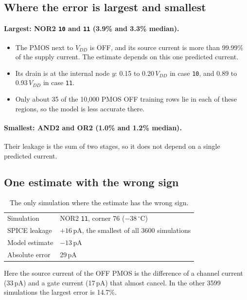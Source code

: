 \documentclass{article}
\begin{document}
\subsection{Where the error is largest and smallest}

\paragraph{Largest: NOR2 \texttt{10} and \texttt{11} (3.9\% and 3.3\% median).}
\begin{itemize}
    \item The PMOS next to $V_{DD}$ is OFF, and its source current is more
          than 99.99\% of the supply current. The estimate depends on this
          one predicted current.
    \item Its drain is at the internal node $y$: 0.15 to 0.20\,$V_{DD}$ in
          case \texttt{10}, and 0.89 to 0.93\,$V_{DD}$ in case \texttt{11}.
    \item Only about 35 of the 10{,}000 PMOS OFF training rows lie in each
          of these regions, so the model is less accurate there.
\end{itemize}

\paragraph{Smallest: AND2 and OR2 (1.0\% and 1.2\% median).}
Their leakage is the sum of two stages, so it does not depend on a single
predicted current.

\subsection{One estimate with the wrong sign}

\begin{table}[H]
\centering
\begin{tabular}{|l|l|}
\hline
Simulation & NOR2 \texttt{11}, corner 76 ($-38\,^\circ$C) \\
SPICE leakage & $+16$\,pA, the smallest of all 3600 simulations \\
Model estimate & $-13$\,pA \\
Absolute error & 29\,pA \\
\hline
\end{tabular}
\caption{The only simulation where the estimate has the wrong sign.}
\label{tab:sign}
\end{table}

Here the source current of the OFF PMOS is the difference of a channel
current (33\,pA) and a gate current (17\,pA) that almost cancel. In the
other 3599 simulations the largest error is 14.7\%.
\end{document}
